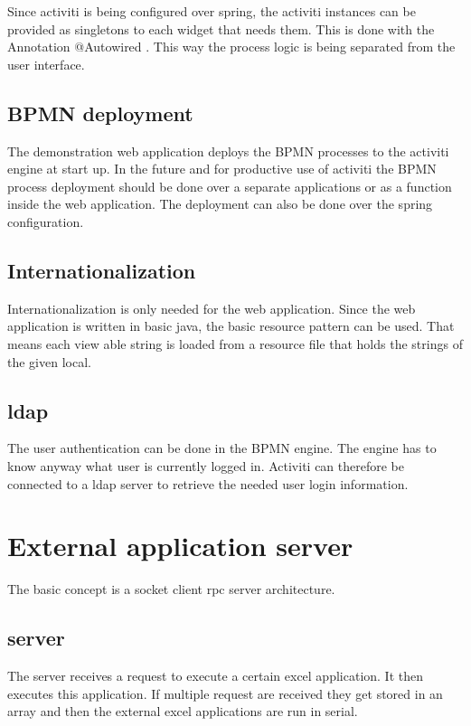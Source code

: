 \documentclass[paper=a4,twoside=false,BCOR=0mm,DIV=calc,fontsize=12pt]{scrartcl}
\begin{document}
Since activiti is being configured over spring, the activiti instances can be provided as singletons to each widget that needs them. This is done with the Annotation @Autowired \cite{autowire}. This way the
process logic is being separated from the user interface.



\subsection{BPMN deployment}
The demonstration web application deploys the BPMN processes to the activiti engine at start up. In the future and for productive use of activiti the
BPMN process deployment should be done over a separate applications or as a function inside the web application. 
The deployment can also be done over the spring configuration.

\subsection{Internationalization}
Internationalization is only needed for the web application. Since the web application is written in basic java, the basic resource pattern can be used. That means each view able string is loaded from a resource file that holds the strings of the given local. 



\subsection{ldap}
The user authentication can be done in the BPMN engine. The engine has to know anyway what user is currently logged in. Activiti can therefore be connected to a ldap server to retrieve the needed user login information.


\section{External application server}
The basic concept is a socket client rpc server architecture. \cite{rpc}

\subsection{server}
The server receives a request to execute a certain excel application. It then executes this application. If multiple request are received they get stored in an array and then the external excel applications are run in serial.
\end{document}
